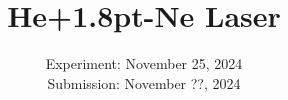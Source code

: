 

\usepackage{xspace}
\newcommand{\HeNe}{He\texorpdfstring{\kern+1.2pt}{}-Ne\xspace}

\publishers{TU Dortmund – Department of Physics}

\subject{\texorpdfstring{\vspace{2ex}}{}V61\texorpdfstring{\vspace{-2ex}}{}} %
\title{He\texorpdfstring{\kern+1.8pt}{}-Ne Laser} %
\date{
	Experiment: November 25, 2024 %
	\\ Submission: November ??, 2024 %
}




\maketitle
\thispagestyle{empty}

\tableofcontents
\newpage








\printbibliography{}

\newpage



